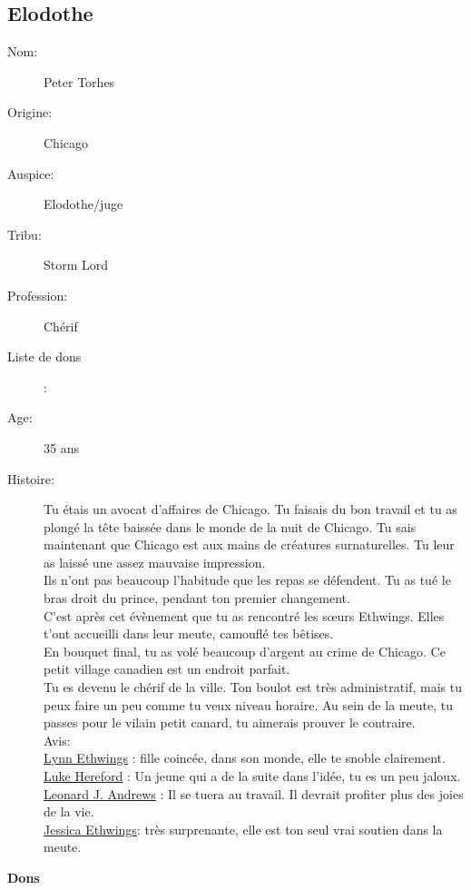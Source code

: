 \documentclass[oneside,12pt]{book}
\begin{document}
\begin{flushleft}
\clearpage
\section{Elodothe}
\begin{description}
\item[Nom:]{Peter Torhes}
\item[Origine:]{Chicago}
\item[Auspice:]{Elodothe/juge}
\item[Tribu:]{Storm Lord}
\item[Profession:]{Chérif}
\item[Liste de dons]:
\item[Age:]{35 ans}
\item[Histoire:]{
Tu étais un avocat d'affaires de Chicago. 
Tu faisais du bon travail et tu as plongé la tête baissée dans le monde de la nuit de Chicago.
Tu sais maintenant que Chicago est aux mains de créatures surnaturelles. 
Tu leur as laissé une assez mauvaise impression. \\
Ils n'ont pas beaucoup l'habitude que les repas se défendent.
Tu as tué le bras droit du prince, pendant ton premier changement. \\
C'est après cet évènement que tu as rencontré les sœurs Ethwings. 
Elles t'ont accueilli dans leur meute, camouflé tes bêtises. \\
En bouquet final, tu as volé beaucoup d'argent au crime de Chicago. 
Ce petit village canadien est un endroit parfait. \\
Tu es devenu le chérif de la ville. Ton boulot est très administratif, mais tu peux faire un peu comme tu veux niveau horaire. 
Au sein de la meute, tu passes pour le vilain petit canard, tu aimerais prouver le contraire. \\

Avis:\\
\underline{Lynn  Ethwings} : fille coincée, dans son monde, elle te snoble clairement.\\
\underline{Luke Hereford} : Un jeune qui a de la suite dans l'idée, tu es un peu jaloux.\\
\underline{Leonard J. Andrews} : Il se tuera au travail. Il devrait profiter plus des joies de la vie.\\
\underline{Jessica  Ethwings}: très surprenante, elle est ton seul vrai soutien dans la meute. \\
}
\end{description}
\clearpage
\textbf{\large Dons} 
\vspace{0.5cm}


\end{flushleft}
\end{document}
